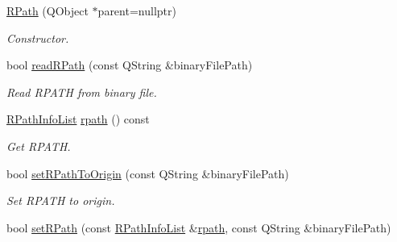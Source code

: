 \begin{DoxyCompactItemize}
\item 
\hyperlink{class_mdt_1_1_deploy_utils_1_1_r_path_ae72424a11cda9203d7aa41505a95c1f2}{R\+Path} (Q\+Object $\ast$parent=nullptr)\hypertarget{class_mdt_1_1_deploy_utils_1_1_r_path_ae72424a11cda9203d7aa41505a95c1f2}{}\label{class_mdt_1_1_deploy_utils_1_1_r_path_ae72424a11cda9203d7aa41505a95c1f2}

\begin{DoxyCompactList}\small\item\em Constructor. \end{DoxyCompactList}\item 
bool \hyperlink{class_mdt_1_1_deploy_utils_1_1_r_path_a470a53bb79b5204d95a3705c1dfe2464}{read\+R\+Path} (const Q\+String \&binary\+File\+Path)\hypertarget{class_mdt_1_1_deploy_utils_1_1_r_path_a470a53bb79b5204d95a3705c1dfe2464}{}\label{class_mdt_1_1_deploy_utils_1_1_r_path_a470a53bb79b5204d95a3705c1dfe2464}

\begin{DoxyCompactList}\small\item\em Read R\+P\+A\+TH from binary file. \end{DoxyCompactList}\item 
\hyperlink{class_mdt_1_1_deploy_utils_1_1_r_path_info_list}{R\+Path\+Info\+List} \hyperlink{class_mdt_1_1_deploy_utils_1_1_r_path_a82905968d20fb6c6ebcae43fca22fa32}{rpath} () const 
\begin{DoxyCompactList}\small\item\em Get R\+P\+A\+TH. \end{DoxyCompactList}\item 
bool \hyperlink{class_mdt_1_1_deploy_utils_1_1_r_path_a3d35bcd84545accfab61fa94b5cb261a}{set\+R\+Path\+To\+Origin} (const Q\+String \&binary\+File\+Path)
\begin{DoxyCompactList}\small\item\em Set R\+P\+A\+TH to origin. \end{DoxyCompactList}\item 
bool \hyperlink{class_mdt_1_1_deploy_utils_1_1_r_path_a2e728628e29bd1e15ea5e4bcff644459}{set\+R\+Path} (const \hyperlink{class_mdt_1_1_deploy_utils_1_1_r_path_info_list}{R\+Path\+Info\+List} \&\hyperlink{class_mdt_1_1_deploy_utils_1_1_r_path_a82905968d20fb6c6ebcae43fca22fa32}{rpath}, const Q\+String \&binary\+File\+Path)\hypertarget{class_mdt_1_1_deploy_utils_1_1_r_path_a2e728628e29bd1e15ea5e4bcff644459}{}\label{class_mdt_1_1_deploy_utils_1_1_r_path_a2e728628e29bd1e15ea5e4bcff644459}


\end{DoxyCompactItemize}

